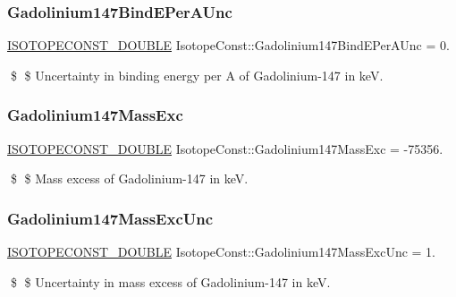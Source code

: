 \subsubsection{\texorpdfstring{Gadolinium147\+Bind\+E\+Per\+A\+Unc}{Gadolinium147BindEPerAUnc}}
{\footnotesize\ttfamily \mbox{\hyperlink{group___isotope_const-_macros_ga8f45a7272ce02c0b4c65c44636ed719a}{I\+S\+O\+T\+O\+P\+E\+C\+O\+N\+S\+T\+\_\+\+D\+O\+U\+B\+LE}} Isotope\+Const\+::\+Gadolinium147\+Bind\+E\+Per\+A\+Unc = 0.}

\$ \$ Uncertainty in binding energy per A of Gadolinium-\/147 in keV. \mbox{\label{group___isotope_const-_gadolinium-_gd147_gac6041ddc169ad7005f7d889c7e1cc539}} 
\subsubsection{\texorpdfstring{Gadolinium147\+Mass\+Exc}{Gadolinium147MassExc}}
{\footnotesize\ttfamily \mbox{\hyperlink{group___isotope_const-_macros_ga8f45a7272ce02c0b4c65c44636ed719a}{I\+S\+O\+T\+O\+P\+E\+C\+O\+N\+S\+T\+\_\+\+D\+O\+U\+B\+LE}} Isotope\+Const\+::\+Gadolinium147\+Mass\+Exc = -\/75356.}

\$ \$ Mass excess of Gadolinium-\/147 in keV. \mbox{\label{group___isotope_const-_gadolinium-_gd147_ga840b881da8590a5d3e7fb1d98f4f2de5}} 
\subsubsection{\texorpdfstring{Gadolinium147\+Mass\+Exc\+Unc}{Gadolinium147MassExcUnc}}
{\footnotesize\ttfamily \mbox{\hyperlink{group___isotope_const-_macros_ga8f45a7272ce02c0b4c65c44636ed719a}{I\+S\+O\+T\+O\+P\+E\+C\+O\+N\+S\+T\+\_\+\+D\+O\+U\+B\+LE}} Isotope\+Const\+::\+Gadolinium147\+Mass\+Exc\+Unc = 1.}

\$ \$ Uncertainty in mass excess of Gadolinium-\/147 in keV. \mbox{\label{group___isotope_const-_gadolinium-_gd147_ga1e72705b0a6b74f9c20c92cad7e07263}} 
